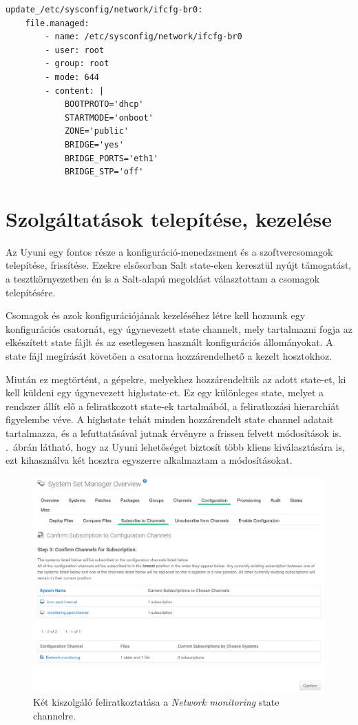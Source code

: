 \begin{lstlisting}[caption=A hálózati konfiguráció frissítését végző Salt state.,label=lst:vhost-salt-formula-mod]
update_/etc/sysconfig/network/ifcfg-br0:
	file.managed:
		- name: /etc/sysconfig/network/ifcfg-br0
		- user: root
		- group: root
		- mode: 644
		- content: |
			BOOTPROTO='dhcp'
			STARTMODE='onboot'
			ZONE='public'
			BRIDGE='yes'
			BRIDGE_PORTS='eth1'
			BRIDGE_STP='off'
\end{lstlisting}

\section{Szolgáltatások telepítése, kezelése}
Az Uyuni egy fontos része a konfiguráció-menedzsment és a szoftvercsomagok telepítése, frissítése. Ezekre elsősorban Salt state-eken keresztül nyújt támogatást, a tesztkörnyezetben én is a Salt-alapú megoldást választottam a csomagok telepítésére.

Csomagok és azok konfigurációjának kezeléséhez létre kell hoznunk egy konfigurációs csatornát, egy úgynevezett state channelt, mely tartalmazni fogja az elkészített state fájlt és az esetlegesen használt konfigurációs állományokat. A state fájl megírását követően a csatorna hozzárendelhető a kezelt hosztokhoz.

Miután ez megtörtént, a gépekre, melyekhez hozzárendeltük az adott state-et, ki kell küldeni egy úgynevezett highstate-et. Ez egy különleges state, melyet a rendszer állít elő a feliratkozott state-ek tartalmából, a feliratkozási hierarchiát figyelembe véve. A highstate tehát minden hozzárendelt state channel adatait  tartalmazza, és a lefuttatásával jutnak érvényre a frissen felvett módosítások is. .~ábrán látható, hogy az Uyuni lehetőséget biztosít több kliens kiválasztására is, ezt kihasználva két hosztra egyszerre alkalmaztam a módosításokat.

\begin{figure}[ht]
	\centering
	\includegraphics[width=15cm]{figures/uyuni-channelsub.png}
	\caption{Két kiszolgáló feliratkoztatása a \textit{Network monitoring} state channelre.}
	\label{fig:uyuni-channelsub}
\end{figure}

